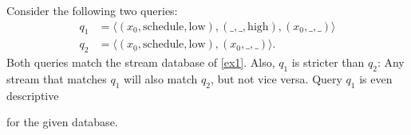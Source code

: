 \begin{example}
Consider the following two queries:
\begin{align*}
    q_1 &= \langle (x_0,\text{schedule},\text{low}),(\_,\_,\text{high}),(x_0,\_,\_)
    \rangle \\
     q_2 &= \langle (x_0,\text{schedule},\text{low}),(x_0,\_,\_) \rangle.
\end{align*}
 Both queries match the stream database of \autoref{ex1}.
Also, $q_1$ is stricter than $q_2$: Any stream that matches $q_1$ will
also match $q_2$, but not vice versa. Query $q_1$ is even descriptive

for the given database.
\end{example}
